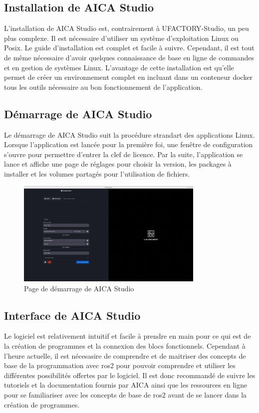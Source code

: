 \subsection{Installation de AICA Studio}
L'installation de AICA Studio est, contrairement à UFACTORY-Studio, un peu plus complexe. Il est nécessaire d'utiliser un système d'exploitation Linux ou Posix. Le guide d'installation \cite{AICADocs} est complet et facile à suivre. Cependant, il est tout de même nécessaire d'avoir quelques connaissance de base en ligne de commandes et en gestion de systèmes Linux. L'avantage de cette installation est qu'elle permet de créer un environnement complet en incluant dans un \gls{conteneur} \gls{docker} tous les outils nécessaire au bon fonctionnement de l'application.

\subsection{Démarrage de AICA Studio}
Le démarrage de AICA Studio suit la procédure strandart des applications Linux. Lorsque l'application est lancée pour la première foi, une fenêtre de configuration s'ouvre pour permettre d'entrer la clef de licence. Par la suite, l'application se lance et affiche une page de réglages pour choisir la version, les packages à installer et les volumes partagés pour l'utilisation de fichiers.

\begin{figure}[H]
    \centering
    \includegraphics[width=0.8\textwidth]{assets/figures/AICA_Mainmenu.png}
    \caption{Page de démarrage de AICA Studio}
    \label{fig:aica_startup}
\end{figure}

\subsection{Interface de AICA Studio}
Le logiciel est relativement intuitif et facile à prendre en main pour ce qui est de la création de programmes et la connexion des blocs fonctionnels. Cependant à l'heure actuelle, il est nécesasire de comprendre et de maitriser des concepts de base de la programmation avec \gls{ros2} pour pouvoir comprendre et utiliser les différentes possibilités offertes par le logiciel. Il est donc recommandé de suivre les tutoriels et la documentation fournis par AICA ainsi que les ressources en ligne pour se familiariser avec les concepts de base de \gls{ros2} avant de se lancer dans la création de programmes.

